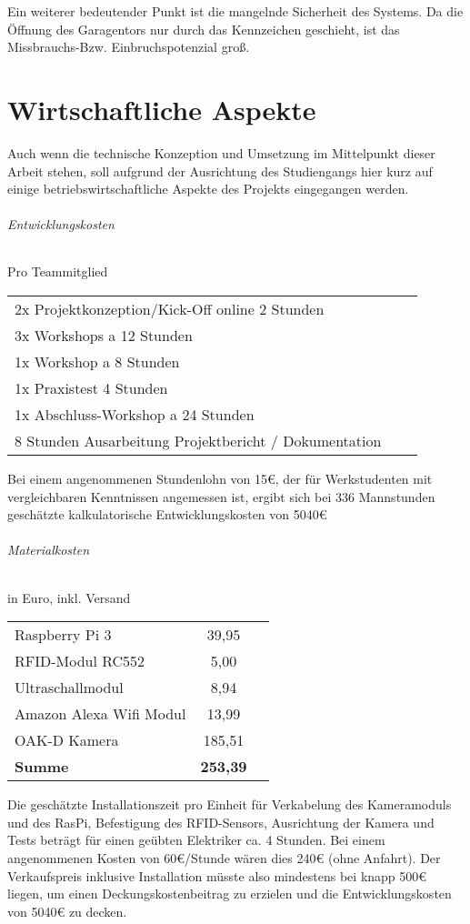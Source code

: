 Ein weiterer bedeutender Punkt ist die mangelnde Sicherheit des Systems. Da die Öffnung des Garagentors nur durch das Kennzeichen geschieht, ist das Missbrauchs-Bzw. Einbruchspotenzial groß.

\chapter{Wirtschaftliche Aspekte}
Auch wenn die technische Konzeption und Umsetzung im Mittelpunkt dieser Arbeit stehen, soll aufgrund der Ausrichtung des Studiengangs hier kurz auf einige betriebswirtschaftliche Aspekte des Projekts eingegangen werden.\subparagraph*{Entwicklungskosten}
   \newline
Pro Teammitglied

\begin{tabular}[h]{lcr}
2x Projektkonzeption/Kick-Off online 2 Stunden \\
3x Workshops a 12 Stunden\\
1x Workshop a 8 Stunden\\
1x Praxistest 4 Stunden\\
1x Abschluss-Workshop a 24 Stunden \\
8 Stunden Ausarbeitung Projektbericht / Dokumentation\\
\end{tabular} \newline

Bei einem angenommenen Stundenlohn von 15€, der für Werkstudenten mit vergleichbaren Kenntnissen angemessen ist, ergibt sich bei 336 Mannstunden geschätzte kalkulatorische Entwicklungskosten von 5040€
\subparagraph*{Materialkosten} in Euro, inkl. Versand  \newline  %

\begin{tabular}[h]{lcr}
Raspberry Pi 3	&   39,95 \autocite{Pi3b} \newline \\
RFID-Modul RC552 &		5,00\autocite{RFID} \newline\\
Ultraschallmodul	&  8,94\autocite{SR04} \newline \\
Amazon Alexa Wifi Modul & 13,99\autocite{eWe}	\\
OAK-D Kamera & 185,51 \\
\textbf{Summe}			&	\textbf{253,39}
\end{tabular} \newline


Die geschätzte Installationszeit pro Einheit für Verkabelung des Kameramoduls und des RasPi, Befestigung des RFID-Sensors, Ausrichtung der Kamera und Tests beträgt für einen geübten Elektriker ca. 4 Stunden.
Bei einem angenommenen Kosten von 60€/Stunde wären dies 240€ (ohne Anfahrt). Der Verkaufspreis inklusive Installation müsste also mindestens bei knapp 500€ liegen, um einen Deckungskostenbeitrag zu erzielen und die Entwicklungskosten von 5040€ zu decken.




